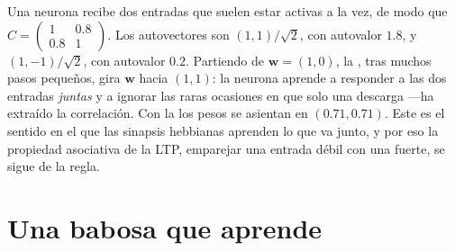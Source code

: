 \begin{example}\label{ex:b3:learning-memory:two-inputs}
Una neurona recibe dos entradas que suelen estar activas a la vez, de modo que $C =
\begin{pmatrix} 1 & 0.8 \\ 0.8 & 1\end{pmatrix}$. Los autovectores son
$(1,1)/\sqrt{2}$, con autovalor $1.8$, y $(1,-1)/\sqrt{2}$, con
autovalor $0.2$. Partiendo de $\mathbf{w} = (1, 0)$, la ,
tras muchos pasos pequeños, gira $\mathbf{w}$ hacia $(1,1)$: la neurona
aprende a responder a las dos entradas \emph{juntas} y a ignorar las
raras ocasiones en que solo una descarga ---ha extraído la correlación.
Con la  los pesos se asientan en $(0.71, 0.71)$. Este es el
sentido en el que las sinapsis hebbianas aprenden lo que va junto, y
por eso la propiedad asociativa de la LTP, emparejar una entrada débil
con una fuerte, se sigue de la regla.
\end{example}

\section{Una babosa que aprende}

